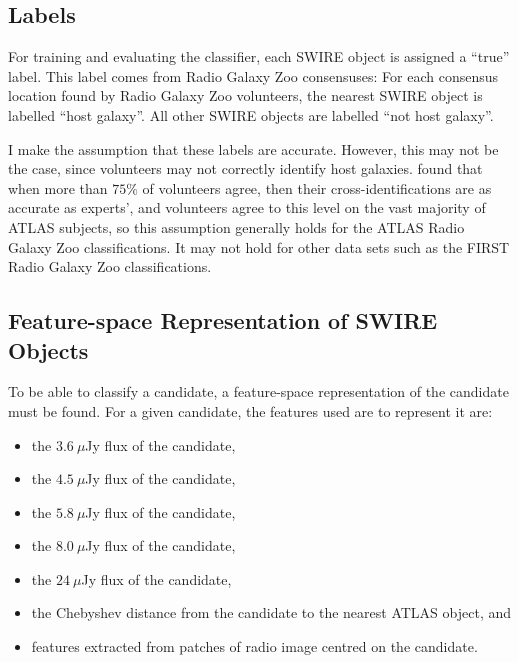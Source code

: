 \documentclass[a4paper]{article}
\newcommand{\sect}{Section }
\begin{document}


    \subsection{Labels}
      \label{sec:labels}

      For training and evaluating the classifier, each SWIRE object is assigned a ``true'' label. This label comes from Radio Galaxy Zoo consensuses: For each consensus location found by Radio Galaxy Zoo volunteers, the nearest SWIRE object is labelled ``host galaxy''. All other SWIRE objects are labelled ``not host galaxy''.

      I make the assumption that these labels are accurate. However, this may not be the case, since volunteers may not correctly identify host galaxies. \citet{banfield15} found that when more than $75\%$ of volunteers agree, then their cross-identifications are as accurate as experts', and volunteers agree to this level on the vast majority of ATLAS subjects, so this assumption generally holds for the ATLAS Radio Galaxy Zoo classifications. It may not hold for other data sets such as the FIRST Radio Galaxy Zoo classifications.


    \subsection{Feature-space Representation of SWIRE Objects}
    \label{sec:features}

      To be able to classify a candidate, a feature-space representation of the candidate must be found. For a given candidate, the features used are to represent it are:
      \begin{itemize}
         \item the $3.6\ \mu$Jy flux of the candidate,
         \item the $4.5\ \mu$Jy flux of the candidate,
         \item the $5.8\ \mu$Jy flux of the candidate,
         \item the $8.0\ \mu$Jy flux of the candidate,
         \item the $24\ \mu$Jy flux of the candidate,
         \item the Chebyshev distance from the candidate to the nearest ATLAS object, and
         \item features extracted from patches of radio image centred on the candidate.
       \end{itemize}
\end{document}
